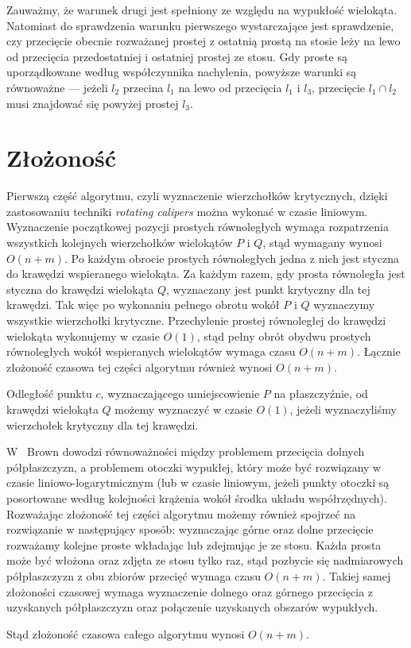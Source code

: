 Zauważmy, że warunek drugi jest spełniony ze względu na wypukłość
wielokąta. Natomiast do sprawdzenia warunku pierwszego wystarczające
jest sprawdzenie, czy przecięcie obecnie rozważanej prostej z ostatnią
prostą na stosie leży na lewo od przecięcia przedostatniej i ostatniej
prostej ze stosu. Gdy proste są uporządkowane według współczynnika
nachylenia, powyższe warunki są równoważne --- jeżeli $l_2$ przecina
$l_1$ na lewo od przecięcia $l_1$ i $l_3$, przecięcie $l_1 \cap l_2$
musi znajdować się powyżej prostej $l_3$.

\section{Złożoność}
Pierwszą część algorytmu, czyli wyznaczenie wierzchołków krytycznych,
dzięki zastosowaniu techniki \emph{rotating calipers} można wykonać w
czasie liniowym. Wyznaczenie początkowej pozycji prostych równoległych
wymaga rozpatrzenia wszystkich kolejnych wierzchołków wielokątów $P$ i
$Q$, stąd wymagany wynosi $O(n + m)$. Po każdym obrocie prostych
równoległych jedna z nich jest styczna do krawędzi wspieranego
wielokąta. Za każdym razem, gdy prosta równoległa jest styczna do
krawędzi wielokąta $Q$, wyznaczany jest punkt krytyczny dla tej
krawędzi. Tak więc po wykonaniu pełnego obrotu wokół $P$ i $Q$
wyznaczymy wszystkie wierzchołki krytyczne. Przechylenie prostej
równoległej do krawędzi wielokąta wykonujemy w czasie $O(1)$, stąd
pełny obrót obydwu prostych równoległych wokół wspieranych wielokątów
wymaga czasu $O(n + m)$.  Łącznie złożoność czasowa tej części
algorytmu również wynosi $O(n + m)$.

Odległość punktu $c$, wyznaczającego umiejscowienie $P$ na
płaszczyźnie, od krawędzi wielokąta $Q$ możemy wyznaczyć w czasie
$O(1)$, jeżeli wyznaczyliśmy wierzchołek krytyczny dla tej krawędzi.

W~\cite{Brown78} Brown dowodzi równoważności między problemem
przecięcia dolnych półpłaszczyzn, a problemem otoczki wypukłej, który
może być rozwiązany w czasie liniowo-logarytmicznym (lub w czasie
liniowym, jeżeli punkty otoczki są posortowane według kolejności
krążenia wokół środka układu współrzędnych). Rozważając złożoność tej
części algorytmu możemy również spojrzeć na rozwiązanie w następujący
sposób: wyznaczając górne oraz dolne przecięcie rozważamy kolejne
proste wkładając lub zdejmując je ze stosu. Każda prosta może być
włożona oraz zdjęta ze stosu tylko raz, stąd pozbycie się nadmiarowych
półpłaszczyzn z obu zbiorów przecięć wymaga czasu $O(n + m)$. Takiej
samej złożoności czasowej wymaga wyznaczenie dolnego oraz górnego
przecięcia z uzyskanych półpłaszczyzn oraz połączenie uzyskanych
obszarów wypukłych.

Stąd złożoność czasowa całego algorytmu wynosi $O(n + m)$.

